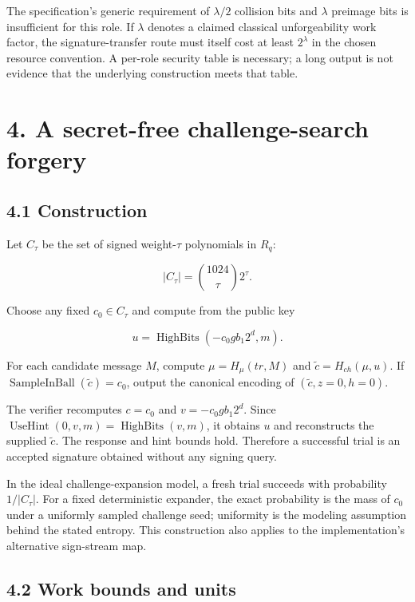 \documentclass[
  american,
  10pt,
  a4paper,
]{article}
\begin{document}
The specification's generic requirement of \(\lambda/2\) collision bits
and \(\lambda\) preimage bits is insufficient for this role. If
\(\lambda\) denotes a claimed classical unforgeability work factor, the
signature-transfer route must itself cost at least \(2^\lambda\) in the
chosen resource convention. A per-role security table is necessary; a
long output is not evidence that the underlying construction meets that
table.

\section{4. A secret-free challenge-search
forgery}\label{a-secret-free-challenge-search-forgery}

\subsection{4.1 Construction}\label{construction}

Let \(C_\tau\) be the set of signed weight-\(\tau\) polynomials in
\(R_q\):

\[
|C_\tau|=\binom{1024}{\tau}2^\tau.
\]

Choose any fixed \(c_0\in C_\tau\) and compute from the public key

\[
u=\operatorname{HighBits}(-c_0gb_1 2^d,m).
\]

For each candidate message \(M\), compute \(\mu=H_\mu(tr,M)\) and
\(\widetilde c=H_{ch}(\mu,u)\). If
\(\operatorname{SampleInBall}(\widetilde c)=c_0\), output the canonical
encoding of \((\widetilde c,z=0,h=0)\).

The verifier recomputes \(c=c_0\) and \(v=-c_0gb_1 2^d\). Since
\(\operatorname{UseHint}(0,v,m)=\operatorname{HighBits}(v,m)\), it
obtains \(u\) and reconstructs the supplied \(\widetilde c\). The
response and hint bounds hold. Therefore a successful trial is an
accepted signature obtained without any signing query.

In the ideal challenge-expansion model, a fresh trial succeeds with
probability \(1/|C_\tau|\). For a fixed deterministic expander, the
exact probability is the mass of \(c_0\) under a uniformly sampled
challenge seed; uniformity is the modeling assumption behind the stated
entropy. This construction also applies to the implementation's
alternative sign-stream map.

\subsection{4.2 Work bounds and units}\label{work-bounds-and-units}
\end{document}
